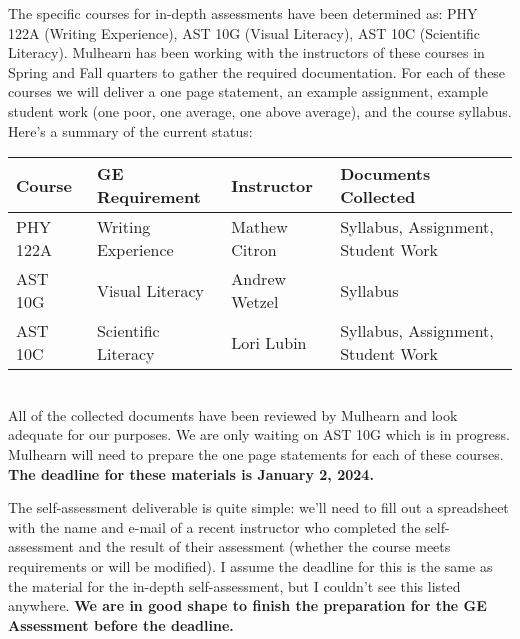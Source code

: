 \documentclass[12pt]{article}
\begin{document}
The specific courses for in-depth assessments have been determined as:  PHY 122A (Writing Experience), 
AST 10G (Visual Literacy), AST 10C (Scientific Literacy).  Mulhearn has been working with the instructors of these courses in Spring and Fall quarters to gather the required documentation.  For each of these courses we will deliver a one page statement, an example assignment, example student work (one poor, one average, one above average), and the course syllabus.  Here's a summary of the current status:\\[10pt]
\begin{tabular}{llll}
\hline
Course   & GE Requirement      & Instructor    & Documents Collected \\
\hline
PHY 122A & Writing Experience  & Mathew Citron & Syllabus, Assignment, Student Work \\
AST 10G  & Visual Literacy     & Andrew Wetzel & Syllabus \\
AST 10C  & Scientific Literacy & Lori Lubin    & Syllabus, Assignment, Student Work\\
\hline
\end{tabular}\\[10pt]
All of the collected documents have been reviewed by Mulhearn and look adequate for our purposes.  We are only waiting on AST 10G which is in progress.  Mulhearn will need to prepare the one page statements for each of these courses.  {\bf The deadline for these materials is January 2, 2024.}

The self-assessment deliverable is quite simple:  we'll need to fill out a spreadsheet with the name and e-mail of a recent instructor who completed the self-assessment and the result of their assessment (whether the course meets requirements or will be modified).  I assume the deadline for this is the same as the material for the in-depth self-assessment, but I couldn't see this listed anywhere.
{\bf We are in good shape to finish the preparation for the GE Assessment before the deadline.}
\end{document}
